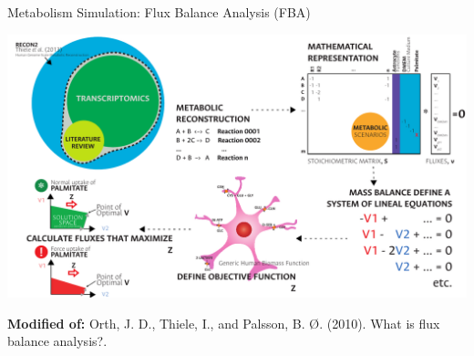 \documentclass[11pt]{beamer}
\begin{document}
\begin{frame}{Metabolism Simulation: Flux Balance Analysis (FBA)}
\begin{center}
\includegraphics[width=\textwidth]{FBA}
\end{center}
{\scriptsize \textbf{Modified  of:} Orth, J. D., Thiele, I., and  Palsson, B. Ø. (2010). What is flux balance analysis?.\\}
\end{frame}
\end{document}
